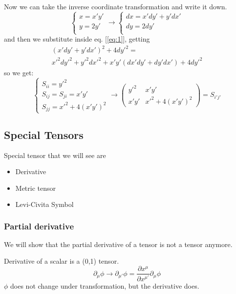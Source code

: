 Now we can take the inverse coordinate transformation and write it down.
\begin{equation}
\begin{cases}
x = x'y' \\
 y = 2y'\\
\end{cases} \to 
\begin{cases}
dx = x'dy' + y'dx' \\
dy = 2dy' \\
\end{cases}
\end{equation}
and then we substitute inside eq. [\ref{eq:1}], getting
\begin{gather*}
	\left( x'dy' + y'dx' \right)^{2} + 4dy'^{2} = \\
	x'^{2}dy'^{2} + y'^{2}dx'^{2} + x'y'\left( dx'dy'+dy'dx' \right) + 4dy'^{2} 
\end{gather*}
so we get:
\begin{equation}
\begin{cases}
S_{ii} = y'^{2} \\
S_{ij} = S_{ji} = x'y' \\
S_{jj} = x'^{2} + 4\left( x'y' \right)^{2}
\end{cases}
\to 
\begin{pmatrix}
y'^{2} & x'y' \\
x'y' & x'^{2}+4\left( x'y' \right)^{2}
\end{pmatrix} = S_{i'j'} 
\end{equation}

\subsection{Special Tensors}
Special tensor that we will see are
\begin{itemize}
	\item Derivative
	\item Metric tensor
	\item Levi-Civita Symbol
\end{itemize}

\subsubsection{Partial derivative}
We will show that the partial derivative of a tensor is not a tensor anymore.\par

Derivative of a scalar is a (0,1) tensor.
\[
\partial_{\mu }\phi \to \partial_{\mu '}\phi = \frac{\partial x^{\mu }}{\partial x^{\mu '}} \partial_{\mu }\phi 
\]
$\phi $ does not change under transformation, but the derivative does.

